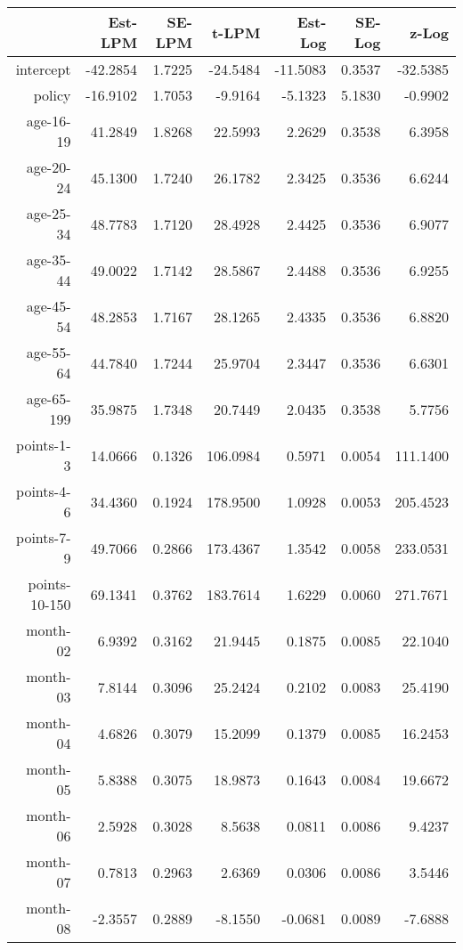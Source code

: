 \documentclass[10pt]{article}
\begin{document}

\begin{table}[ht]
\centering
\begin{tabular}{rrrrrrr}
  \hline
 & Est-LPM & SE-LPM & t-LPM & Est-Log & SE-Log & z-Log \\ 
  \hline
intercept & -42.2854 & 1.7225 & -24.5484 & -11.5083 & 0.3537 & -32.5385 \\ 
  policy & -16.9102 & 1.7053 & -9.9164 & -5.1323 & 5.1830 & -0.9902 \\ 
  age-16-19 & 41.2849 & 1.8268 & 22.5993 & 2.2629 & 0.3538 & 6.3958 \\ 
  age-20-24 & 45.1300 & 1.7240 & 26.1782 & 2.3425 & 0.3536 & 6.6244 \\ 
  age-25-34 & 48.7783 & 1.7120 & 28.4928 & 2.4425 & 0.3536 & 6.9077 \\ 
  age-35-44 & 49.0022 & 1.7142 & 28.5867 & 2.4488 & 0.3536 & 6.9255 \\ 
  age-45-54 & 48.2853 & 1.7167 & 28.1265 & 2.4335 & 0.3536 & 6.8820 \\ 
  age-55-64 & 44.7840 & 1.7244 & 25.9704 & 2.3447 & 0.3536 & 6.6301 \\ 
  age-65-199 & 35.9875 & 1.7348 & 20.7449 & 2.0435 & 0.3538 & 5.7756 \\ 
  points-1-3 & 14.0666 & 0.1326 & 106.0984 & 0.5971 & 0.0054 & 111.1400 \\ 
  points-4-6 & 34.4360 & 0.1924 & 178.9500 & 1.0928 & 0.0053 & 205.4523 \\ 
  points-7-9 & 49.7066 & 0.2866 & 173.4367 & 1.3542 & 0.0058 & 233.0531 \\ 
  points-10-150 & 69.1341 & 0.3762 & 183.7614 & 1.6229 & 0.0060 & 271.7671 \\ 
  month-02 & 6.9392 & 0.3162 & 21.9445 & 0.1875 & 0.0085 & 22.1040 \\ 
  month-03 & 7.8144 & 0.3096 & 25.2424 & 0.2102 & 0.0083 & 25.4190 \\ 
  month-04 & 4.6826 & 0.3079 & 15.2099 & 0.1379 & 0.0085 & 16.2453 \\ 
  month-05 & 5.8388 & 0.3075 & 18.9873 & 0.1643 & 0.0084 & 19.6672 \\ 
  month-06 & 2.5928 & 0.3028 & 8.5638 & 0.0811 & 0.0086 & 9.4237 \\ 
  month-07 & 0.7813 & 0.2963 & 2.6369 & 0.0306 & 0.0086 & 3.5446 \\ 
  month-08 & -2.3557 & 0.2889 & -8.1550 & -0.0681 & 0.0089 & -7.6888 \\ 

\end{tabular}
\end{table}
\end{document}
